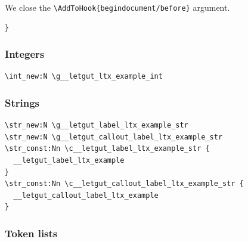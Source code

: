 \documentclass{letgut}
\begin{document}
We close the \lstinline+\AddToHook{begindocument/before}+ argument.

\begin{lstlisting}
}
\end{lstlisting}


\subsubsection{Integers}
\label{sec:orgb3e9382}
\begin{lstlisting}
\int_new:N \g__letgut_ltx_example_int
\end{lstlisting}

\subsubsection{Strings}
\label{sec:orgdd18dd8}

\begin{lstlisting}
\str_new:N \g__letgut_label_ltx_example_str
\str_new:N \g__letgut_callout_label_ltx_example_str
\str_const:Nn \c__letgut_label_ltx_example_str {
  __letgut_label_ltx_example
}
\str_const:Nn \c__letgut_callout_label_ltx_example_str {
  __letgut_callout_label_ltx_example
}
\end{lstlisting}

\subsubsection{Token lists}
\label{sec:orgaf6d8ec}
\end{document}
